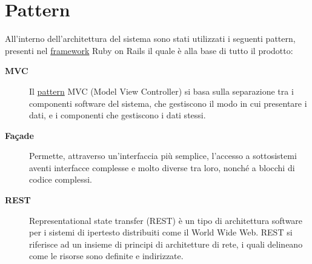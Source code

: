 \documentclass[11pt,a4paper]{article}
\begin{document}
\section{Pattern}
All'interno dell'architettura del sistema sono stati utilizzati i seguenti pattern, presenti nel \underline{framework} Ruby on Rails il quale è alla base di tutto il prodotto:
\begin{description}
 \item[\textbf{MVC}]
Il \underline{pattern} MVC (Model View Controller) si basa sulla separazione tra i componenti software del sistema, che gestiscono il modo in cui presentare i dati, e i componenti che gestiscono i dati stessi.
 \item[\textbf{Façade}]
Permette, attraverso un'interfaccia più semplice, l'accesso a sottosistemi aventi interfacce complesse e molto diverse tra loro, nonché a blocchi di codice complessi.
\item[\textbf{REST}]
Representational state transfer (REST) è un tipo di architettura software per i sistemi di ipertesto distribuiti come il World Wide Web.
REST si riferisce ad un insieme di principi di architetture di rete, i quali delineano come le risorse sono definite e indirizzate.


\end{description}
\end{document}
